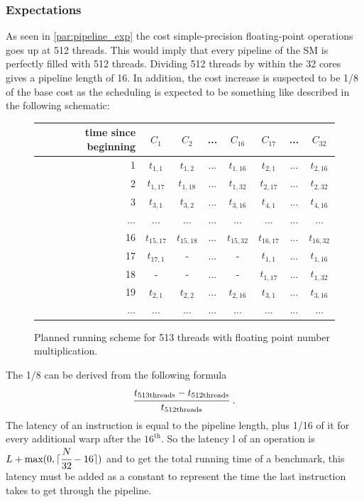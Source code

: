 \documentclass{article}
\DeclarePairedDelimiter\ceil{\lceil}{\rceil}
\begin{document}
	\subsubsection{Expectations}
	As seen in \ref{par:pipeline_exp} the cost simple-precision floating-point
    operations goes up at 512 threads. This would imply that every pipeline of
    the SM is perfectly filled with 512 threads. Dividing 512 threads by within
    the 32 cores gives a pipeline length of 16. In addition, the cost increase
    is suspected to be 1/8 of the base cost as the scheduling is expected to be
    something like described in the following schematic:
    
    \begin{figure}[h]
      \centering
       \begin{tabular}{ | r || c | c | c | c || c | c | c | }
    	    \hline
    	    time since beginning & $C_1$ & $C_2$ & ... & $C_{16}$ & $C_{17}$ & ... & $C_{32}$ \\ \hline  \hline
    	   1 & $t_{1,1}$ & $t_{1,2}$ & ... & $t_{1,16}$ & $t_{2, 1}$ & ... & $t_{2, 16}$ \\ \hline 
    	   2 & $t_{1,17}$ & $t_{1,18}$ & ... & $t_{1,32}$ & $t_{2, 17}$ & ... & $t_{2, 32}$ \\ \hline
    	   3 & $t_{3,1}$ & $t_{3,2}$ & ... & $t_{3,16}$ & $t_{4, 1}$ & ... & $t_{4, 16}$ \\ \hline
    	   ... & ... & ... & ... & ... & ... & ... & ... \\ \hline
    	   16 & $t_{15,17}$ & $t_{15,18}$ & ... & $t_{15,32}$ & $t_{16,17}$ & ... & $t_{16, 32}$ \\ \hline
    	   17 & $t_{17,1}$ & - & ... & - & $t_{1,1}$ & ... & $t_{1, 16}$ \\ \hline
    	   18 & - & - & ... & - & $t_{1,17}$ & ... & $t_{1, 32}$ \\ \hline
    	   19 & $t_{2,1}$ & $t_{2,2}$ & ... & $t_{2,16}$ & $t_{3,1}$ & ... & $t_{3,16}$ \\ \hline
    	   ... & ... & ... & ... & ... & ... & ... & ... \\ \hline
  	\end{tabular}
  	\captionsetup{justification=centering}
  	\caption{Planned running scheme for 513 threads with floating point number multiplication.}
  	\label{fig:fp_prediction_513}
   \end{figure}

    The 1/8 can be derived from the following formula
    \[ \cfrac{t_{\text{513threads}} - t_{\text{512threads}}}{t_{\text{512threads}}} \text{  .}\]
    The latency of an instruction is equal to the pipeline length, plus 1/16 of
    it for every additional warp after the $16^{\text{th}}$. So the latency l of an 
    operation is $L + \text{max}(0, \ceil{\cfrac{N}{32} -16})$ and to get the total
    running time of a benchmark, this latency must be added as a constant to
    represent the time the last instruction takes to get through the pipeline.
\end{document}
